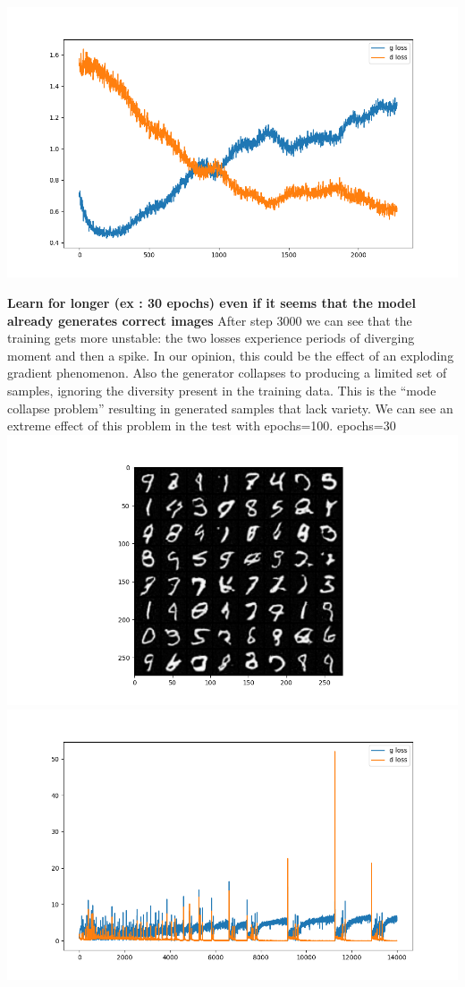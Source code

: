 \includegraphics{./images/Pasted image 20231229114057.png}

\textbf{Learn for longer (ex : 30 epochs) even if it seems that the
model already generates correct images} After step 3000 we can see that
the training gets more unstable: the two losses experience periods of
diverging moment and then a spike. In our opinion, this could be the
effect of an exploding gradient phenomenon. Also the generator collapses
to producing a limited set of samples, ignoring the diversity present in
the training data. This is the ``mode collapse problem'' resulting in
generated samples that lack variety. We can see an extreme effect of
this problem in the test with epochs=100. epochs=30
\includegraphics{./images/Pasted image 20231228115823.png}\includegraphics{./images/Pasted image 20231228115835.png}
